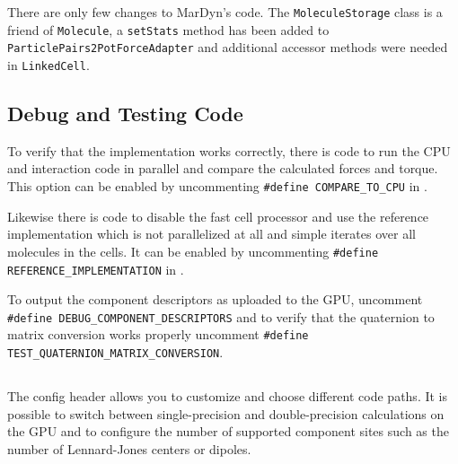 There are only few changes to MarDyn's code. The \lstinline!MoleculeStorage! class is a friend of \lstinline!Molecule!, a \lstinline!setStats! method has been added to \lstinline!ParticlePairs2PotForceAdapter! and additional accessor methods were needed in \lstinline!LinkedCell!.

\subsection{Debug and Testing Code}
To verify that the \cuda{} implementation works correctly, there is code to run the CPU and \cuda{} interaction code in parallel and compare the calculated forces and torque.
This option can be enabled by uncommenting \lstinline!#define COMPARE_TO_CPU! in .

Likewise there is code to disable the fast cell processor and use the reference implementation which is not parallelized at all and simple iterates over all molecules in the cells.
It can be enabled by uncommenting \lstinline!#define REFERENCE_IMPLEMENTATION! in .

To output the component descriptors as uploaded to the GPU, uncomment \lstinline!#define DEBUG_COMPONENT_DESCRIPTORS! and to verify that the quaternion to matrix conversion works properly uncomment \lstinline!#define TEST_QUATERNION_MATRIX_CONVERSION!.

\subsection{}
The config header allows you to customize and choose different code paths. It is possible to switch between single-precision and double-precision calculations on the GPU and to configure the number of supported component sites such as the number of Lennard-Jones centers or dipoles.
